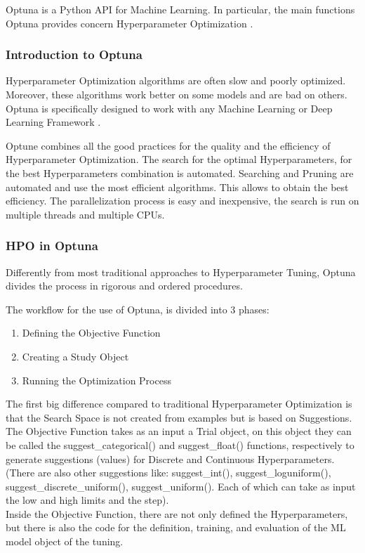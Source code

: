 Optuna is a Python API for Machine Learning. In particular, the main functions Optuna provides concern Hyperparameter Optimization \cite{Optuna}.

\subsubsection{Introduction to Optuna}

Hyperparameter Optimization algorithms are often slow and poorly optimized. Moreover, these algorithms work better on some models and are bad on others.
Optuna is specifically designed to work with any Machine Learning or Deep Learning Framework \cite{Tesi-1.5}.

Optune combines all the good practices for the quality and the efficiency of Hyperparameter Optimization.
The search for the optimal Hyperparameters, for the best Hyperparameters combination is automated.
Searching and Pruning are automated and use the most efficient algorithms. This allows to obtain the best efficiency.
The parallelization process is easy and inexpensive, the search is run on multiple threads and multiple CPUs.

\subsubsection{HPO in Optuna}

Differently from most traditional approaches to Hyperparameter Tuning, Optuna divides the process in rigorous and ordered procedures.

The workflow for the use of Optuna, is divided into 3 phases:
\begin{enumerate}[itemsep=0.1cm]
	\item Defining the Objective Function
	\item Creating a Study Object
	\item Running the Optimization Process
\end{enumerate}

The first big difference compared to traditional Hyperparameter Optimization is that the Search Space is not created from examples but is based on Suggestions.
\\[0.3cm]The Objective Function takes as an input a Trial object, on this object they can be called the suggest\_categorical() and suggest\_float() functions, respectively to generate suggestions (values) for Discrete and Continuous Hyperparameters.
(There are also other suggestions like: suggest\_int(), suggest\_loguniform(), suggest\_discrete\_uniform(), suggest\_uniform(). Each of which can take as input the low and high limits and the step).
\\[0.3cm]Inside the Objective Function, there are not only defined the Hyperparameters, but there is also the code for the definition, training, and evaluation of the ML model object of the tuning.

